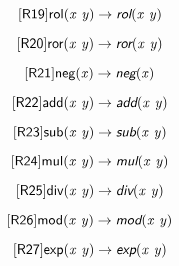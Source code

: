 \documentclass[10pt,leqno,fleqn]{article}
\newcommand{\artVariable}[1]{\mbox{\em #1\/}}
\newcommand{\artConstructor}[1]{\mbox{\sf #1}}
\newcommand{\artSpecial}[1]{\mbox{\sf\em #1}}
\begin{document}
\begin{equation}
\tag*{[\artConstructor{\sf R19}]}\artConstructor{\sf rol}(\artVariable{x}\ \artVariable{y})\rightarrow \artSpecial{rol}(\artVariable{x}\ \artVariable{y})
\end{equation}

\begin{equation}
\tag*{[\artConstructor{\sf R20}]}\artConstructor{\sf ror}(\artVariable{x}\ \artVariable{y})\rightarrow \artSpecial{ror}(\artVariable{x}\ \artVariable{y})
\end{equation}

\begin{equation}
\tag*{[\artConstructor{\sf R21}]}\artConstructor{\sf neg}(\artVariable{x})\rightarrow \artSpecial{neg}(\artVariable{x})
\end{equation}

\begin{equation}
\tag*{[\artConstructor{\sf R22}]}\artConstructor{\sf add}(\artVariable{x}\ \artVariable{y})\rightarrow \artSpecial{add}(\artVariable{x}\ \artVariable{y})
\end{equation}

\begin{equation}
\tag*{[\artConstructor{\sf R23}]}\artConstructor{\sf sub}(\artVariable{x}\ \artVariable{y})\rightarrow \artSpecial{sub}(\artVariable{x}\ \artVariable{y})
\end{equation}

\begin{equation}
\tag*{[\artConstructor{\sf R24}]}\artConstructor{\sf mul}(\artVariable{x}\ \artVariable{y})\rightarrow \artSpecial{mul}(\artVariable{x}\ \artVariable{y})
\end{equation}

\begin{equation}
\tag*{[\artConstructor{\sf R25}]}\artConstructor{\sf div}(\artVariable{x}\ \artVariable{y})\rightarrow \artSpecial{div}(\artVariable{x}\ \artVariable{y})
\end{equation}

\begin{equation}
\tag*{[\artConstructor{\sf R26}]}\artConstructor{\sf mod}(\artVariable{x}\ \artVariable{y})\rightarrow \artSpecial{mod}(\artVariable{x}\ \artVariable{y})
\end{equation}

\begin{equation}
\tag*{[\artConstructor{\sf R27}]}\artConstructor{\sf exp}(\artVariable{x}\ \artVariable{y})\rightarrow \artSpecial{exp}(\artVariable{x}\ \artVariable{y})
\end{equation}
\end{document}
